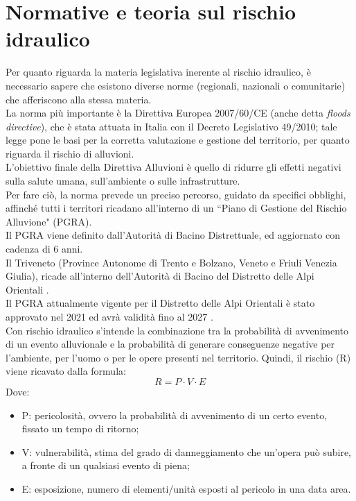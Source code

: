 \section{Normative e teoria sul rischio idraulico}
Per quanto riguarda la materia legislativa inerente al rischio idraulico, è necessario sapere che esistono diverse norme (regionali, nazionali o comunitarie) che afferiscono alla stessa materia.\\
La norma più importante è la Direttiva Europea 2007/60/CE (anche detta \textit{floods directive}), che è stata attuata in Italia con il Decreto Legislativo 49/2010; tale legge pone le basi per la corretta valutazione e gestione del territorio, per quanto riguarda il rischio di alluvioni.\\
L'obiettivo finale della Direttiva Alluvioni è quello di ridurre gli effetti negativi sulla salute umana, sull'ambiente o sulle infrastrutture.\\
Per fare ciò, la norma prevede un preciso percorso, guidato da specifici obblighi, affinché tutti i territori ricadano all'interno di un ``Piano di Gestione del Rischio Alluvione" (PGRA).\\
Il PGRA viene definito dall'Autorità di Bacino Distrettuale, ed aggiornato con cadenza di 6 anni.\\
Il Triveneto (Province Autonome di Trento e Bolzano, Veneto e Friuli Venezia Giulia), ricade all'interno dell'Autorità di Bacino del Distretto delle Alpi Orientali \cite{distrettoalpiorientali}.\\
Il PGRA attualmente vigente per il Distretto delle Alpi Orientali è stato approvato nel 2021 ed avrà validità fino al 2027 \cite{pgra}.\\
Con rischio idraulico s'intende la combinazione tra la probabilità di avvenimento di un evento alluvionale e la probabilità di generare conseguenze negative per l'ambiente, per l'uomo o per le opere presenti nel territorio. Quindi, il rischio (R) viene ricavato dalla formula:
\begin{equation}
    R = P \cdot V \cdot E
\end{equation}
Dove: 
\begin{itemize}
    \item P: pericolosità, ovvero la probabilità di avvenimento di un certo evento, fissato un tempo di ritorno;
    \item V: vulnerabilità, stima del grado di danneggiamento che un'opera può subire, a fronte di un qualsiasi evento di piena;
    \item E: esposizione, numero di elementi/unità esposti al pericolo in una data area.
\end{itemize}

